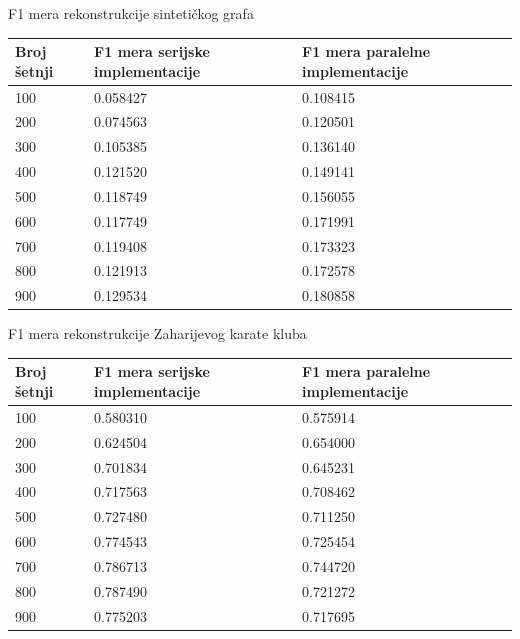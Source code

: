 \documentclass{beamer}
\begin{document}
\begin{frame}{F1 mera rekonstrukcije sintetičkog grafa}
    \centering
        \begin{table}
        \label{tab:4.10}
        \begin{tabular}{p{1in}p{1in}p{1in}}
        \hline
        Broj šetnji & F1 mera serijske implementacije & F1 mera paralelne implementacije \\
        \hline
        100 & 0.058427 & 0.108415 \\
        200 & 0.074563 & 0.120501 \\
        300 & 0.105385 & 0.136140 \\
        400 & 0.121520 & 0.149141 \\
        500 & 0.118749 & 0.156055 \\
        600 & 0.117749 & 0.171991 \\
        700 & 0.119408 & 0.173323 \\
        800 & 0.121913 & 0.172578 \\
        900 & 0.129534 & 0.180858 \\
        \hline
    \end{tabular}
    \end{table}
\end{frame}
    
\begin{frame}{F1 mera rekonstrukcije Zaharijevog karate kluba}
    \centering 
    \begin{table}
        \label{tab:4.4}
        \begin{tabular}{p{1in}p{1in}p{1in}}
        \hline
        Broj šetnji & F1 mera serijske implementacije & F1 mera paralelne implementacije \\
        \hline
        100 & 0.580310 & 0.575914 \\
        200 & 0.624504 & 0.654000 \\
        300 & 0.701834 & 0.645231 \\
        400 & 0.717563 & 0.708462 \\
        500 & 0.727480 & 0.711250 \\
        600 & 0.774543 & 0.725454 \\
        700 & 0.786713 & 0.744720 \\
        800 & 0.787490 & 0.721272 \\
        900 & 0.775203 & 0.717695 \\
        \hline
    \end{tabular}
\end{table}
\end{frame}
\end{document}
